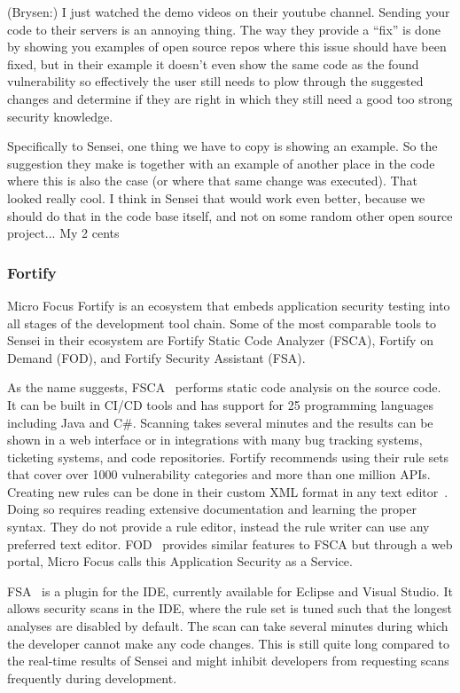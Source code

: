 (Brysen:)
I just watched the demo videos on their youtube channel.
Sending your code to their servers is an annoying thing.
The way they provide a “fix” is done by showing you examples of open source repos where this issue should have been fixed, but in their example it doesn’t even show the same code as the found vulnerability so effectively the user still needs to plow through the suggested changes and determine if they are right in which they still need a good too strong security knowledge.

Specifically to Sensei, one thing we have to copy is showing an example. So the suggestion they make is together with an example of another place in the code where this is also the case (or where that same change was executed). That looked really cool. I think in Sensei that would work even better, because we should do that in the code base itself, and not on some random other open source project... My 2 cents

\subsubsection{Fortify}
Micro Focus Fortify is an ecosystem that embeds application security testing into all stages of the development tool chain. Some of the most comparable tools to Sensei in their ecosystem are Fortify Static Code Analyzer (FSCA), Fortify on Demand (FOD), and Fortify Security Assistant (FSA). 

As the name suggests, FSCA~\cite{fsca} performs static code analysis on the source code. It can be built in CI/CD tools and has support for 25 programming languages including Java and C\#. Scanning takes several minutes and the results can be shown in a web interface or in integrations with many bug tracking systems, ticketing systems, and code repositories. Fortify recommends using their rule sets that cover over 1000 vulnerability categories and more than one million APIs. Creating new rules can be done in their custom XML format in any text editor~\cite{fsca-curstom-rules}. Doing so requires reading extensive documentation and learning the proper syntax. They do not provide a rule editor, instead the rule writer can use any preferred text editor. FOD~\cite{fod} provides similar features to FSCA but through a web portal, Micro Focus calls this Application Security as a Service. 

FSA~\cite{fsa} is a plugin for the IDE, currently available for Eclipse and Visual Studio. It allows security scans in the IDE, where the rule set is tuned such that the longest analyses are disabled by default. The scan can take several minutes during which the developer cannot make any code changes. This is still quite long compared to the real-time results of Sensei and might inhibit developers from requesting scans frequently during development. 


